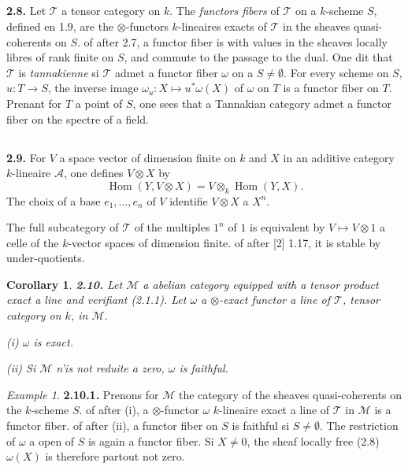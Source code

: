 \documentclass[12pt,a4paper]{article}
\theoremstyle{plain}
\newtheorem{corollary}[theorem]{Corollary}
\theoremstyle{definition}
\theoremstyle{remark}
\newtheorem{example}[theorem]{Example}
\DeclareMathOperator{\Hom}{Hom}
\begin{document}
\subsection{}

\textbf{2.8.} Let $\mathcal{T}$ a tensor category on $k$. The \emph{functors fibers} of $\mathcal{T}$ on a $k$-scheme $S$, defined en 1.9, are the $\otimes$-functors $k$-lineaires exacts of $\mathcal{T}$ in the sheaves quasi-coherents on $S$. of after 2.7, a functor fiber is with values in the sheaves locally libres of rank finite on $S$, and commute to the passage to the dual. One dit that $\mathcal{T}$ is \emph{tannakienne} si $\mathcal{T}$ admet a functor fiber $\omega$ on a $S \neq \emptyset$. For every scheme on $S$, $u : T \to S$, the inverse image $\omega_u : X \mapsto u^*\omega(X)$ of $\omega$ on $T$ is a functor fiber on $T$. Prenant for $T$ a point of $S$, one sees that a Tannakian category admet a functor fiber on the spectre of a field.

\subsection{}

\textbf{2.9.} For $V$ a space vector of dimension finite on $k$ and $X$ in an additive category $k$-lineaire $\mathcal{A}$, one defines $V \otimes X$ by
\[
\Hom(Y, V \otimes X) = V \otimes_k \Hom(Y,X).
\]
The choix of a base $e_1, \ldots, e_n$ of $V$ identifie $V \otimes X$ a $X^n$.

The full subcategory of $\mathcal{T}$ of the multiples $1^n$ of $1$ is equivalent by $V \mapsto V \otimes 1$ a celle of the $k$-vector spaces of dimension finite. of after [2] 1.17, it is stable by under-quotients.

\begin{corollary}\label{cor:2.10}
\textbf{2.10.} Let $\mathcal{M}$ a abelian category equipped with a tensor product exact a line and verifiant (2.1.1). Let $\omega$ a $\otimes$-exact functor a line of $\mathcal{T}$, tensor category on $k$, in $\mathcal{M}$.

\emph{(i)} $\omega$ is exact.

\emph{(ii)} Si $\mathcal{M}$ n'is not reduite a zero, $\omega$ is faithful.
\end{corollary}

\begin{example}
\textbf{2.10.1.} Prenons for $\mathcal{M}$ the category of the sheaves quasi-coherents on the $k$-scheme $S$. of after (i), a $\otimes$-functor $\omega$ $k$-lineaire exact a line of $\mathcal{T}$ in $\mathcal{M}$ is a functor fiber. of after (ii), a functor fiber on $S$ is faithful si $S \neq \emptyset$. The restriction of $\omega$ a open of $S$ is again a functor fiber. Si $X \neq 0$, the sheaf locally free (2.8) $\omega(X)$ is therefore partout not zero.
\end{example}
\end{document}
